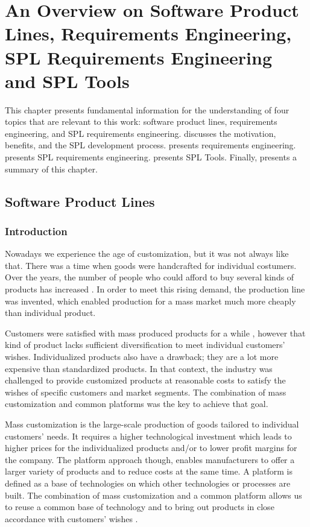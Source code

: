 \chapter{An Overview on Software Product Lines, Requirements Engineering, SPL
Requirements Engineering and SPL Tools}
\label{ch:background}


This chapter presents fundamental information for the understanding of four
topics that are relevant to this work: software product lines, requirements
engineering, and \ac{SPL} requirements engineering.  discusses the
motivation, benefits, and the SPL development process.
 presents requirements engineering.
 presents \ac{SPL} requirements engineering.
 presents \ac{SPL} Tools. Finally,  presents a
summary of this chapter.


\section{Software Product Lines}
\label{sc:productlines}

\subsection{Introduction}
Nowadays we experience the age of customization, but it was not always like
that. There was a time when goods were handcrafted for individual costumers. 
Over the years, the number of people who could afford to buy several kinds of 
products has increased \citep{Pohl2005}. In order to meet this rising demand, 
the production line was invented, which enabled production for a mass market much 
more cheaply than individual product.

Customers were satisfied with mass produced products for a while \citep{Pohl2005}, 
however that kind of product lacks sufficient diversification to meet individual
customers’ wishes. Individualized products also have a drawback; they are a lot more expensive 
than standardized products. In that context, the industry was challenged to provide customized 
products at reasonable costs to satisfy the wishes of specific customers and market segments. 
The combination of mass customization and common platforms was the key to achieve that goal.

Mass customization is the large-scale production of goods tailored to individual
customers’ needs. It requires a higher technological investment which leads to higher prices for 
the individualized products and/or to lower profit margins for the company. The platform approach 
though, enables manufacturers to offer a larger variety of products and to reduce costs at the same 
time. A platform is defined as a base of technologies on which other technologies or processes are 
built. The combination of mass customization and a common platform allows us to reuse a common 
base of technology and to bring out products in close accordance with customers’ wishes \citep{Pohl2005}.

